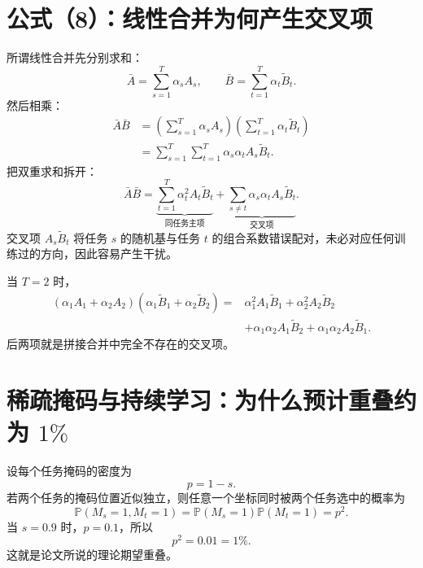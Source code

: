 \documentclass[UTF8,12pt,a4paper,fontset=none]{ctexart}
\numberwithin{equation}{section}
\newcommand{\Prob}{\mathbb{P}}
\begin{document}
\section{公式（8）：线性合并为何产生交叉项}

所谓线性合并先分别求和：
\begin{equation}
  \bar A=\sum_{s=1}^{T}\alpha_sA_s,
  \qquad
  \bar B=\sum_{t=1}^{T}\alpha_t\widetilde B_t.
\end{equation}
然后相乘：
\begin{align}
  \bar A\bar B
  &=\left(\sum_{s=1}^{T}\alpha_sA_s\right)
  \left(\sum_{t=1}^{T}\alpha_t\widetilde B_t\right)\\
  &=\sum_{s=1}^{T}\sum_{t=1}^{T}
  \alpha_s\alpha_tA_s\widetilde B_t.
  \tag{8}
  \label{eq:paper8}
\end{align}
把双重求和拆开：
\begin{equation}
  \bar A\bar B
  =\underbrace{\sum_{t=1}^{T}\alpha_t^2A_t\widetilde B_t}_{\text{同任务主项}}
  +\underbrace{\sum_{s\neq t}\alpha_s\alpha_tA_s\widetilde B_t}_{\text{交叉项}}.
\end{equation}
交叉项 $A_s\widetilde B_t$ 将任务 $s$ 的随机基与任务 $t$ 的组合系数错误配对，未必对应任何训练过的方向，因此容易产生干扰。

\begin{examplebox}[两个任务时的展开]
当 $T=2$ 时，
\begin{align*}
  (\alpha_1A_1+\alpha_2A_2)
  (\alpha_1\widetilde B_1+\alpha_2\widetilde B_2)
  ={}&\alpha_1^2A_1\widetilde B_1
  +\alpha_2^2A_2\widetilde B_2\\
  &+\alpha_1\alpha_2A_1\widetilde B_2
  +\alpha_1\alpha_2A_2\widetilde B_1.
\end{align*}
后两项就是拼接合并中完全不存在的交叉项。
\end{examplebox}

\section{稀疏掩码与持续学习：为什么预计重叠约为 \texorpdfstring{$1\%$}{1 percent}}

设每个任务掩码的密度为
\begin{equation}
  p=1-s.
\end{equation}
若两个任务的掩码位置近似独立，则任意一个坐标同时被两个任务选中的概率为
\begin{equation}
  \Prob(M_s=1,M_t=1)
  =\Prob(M_s=1)\Prob(M_t=1)=p^2.
\end{equation}
当 $s=0.9$ 时，$p=0.1$，所以
\begin{equation}
  p^2=0.01=1\%.
\end{equation}
这就是论文所说的理论期望重叠。
\end{document}
